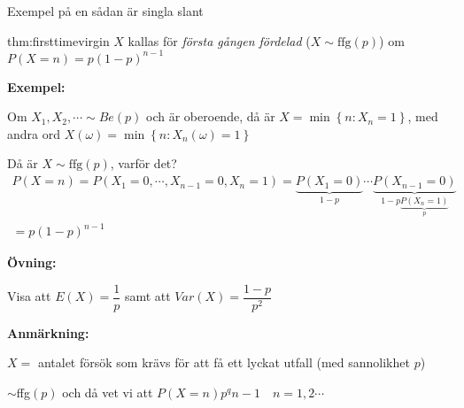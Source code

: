 \par\bigskip
\noindent Exempel på en sådan är singla slant
\par\bigskip
\begin{theo}{thm:firsttimevirgin}
  $X$ kallas för \textit{första gången fördelad} ($X\sim \text{ffg}(p)$) om $P(X=n) = p(1-p)^{n-1}$
\end{theo}
\par\bigskip
\noindent\textbf{Exempel:}\par
\noindent Om $X_1,X_2,\cdots\sim Be(p)$ och är oberoende, då är $X = \min\left\{n:X_n=1\right\}$, med andra ord $X(\omega) = \min\left\{n:X_n(\omega) = 1\right\}$ \par
\noindent Då är $X\sim\text{ffg}(p)$, varför det?
\begin{equation*}
  \begin{gathered}
    P(X=n) = P(X_1=0,\cdots,X_{n-1}=0, X_n=1) = \underbrace{P(X_1=0)}_{\text{$1-p$}}\cdots \underbrace{P(X_{n-1}=0)}_{\text{$1-p$}\underbrace{P(X_{n}=1)}_{\text{$p$}}}\\
    = p(1-p)^{n-1}
  \end{gathered}
\end{equation*}
\par\bigskip
\noindent\textbf{Övning:}\par
\noindent Visa att $E(X) =\dfrac{1}{p}$ samt att $Var(X) = \dfrac{1-p}{p^2}$
\par\bigskip
\noindent\textbf{Anmärkning:}\par
\noindent $X = $ antalet försök som krävs för att få ett lyckat utfall (med sannolikhet $p$)\par
\noindent $\sim $ffg$(p)$ och då vet vi att $P(X=n)p^q{n-1}\quad n=1,2\cdots$
\newpage
